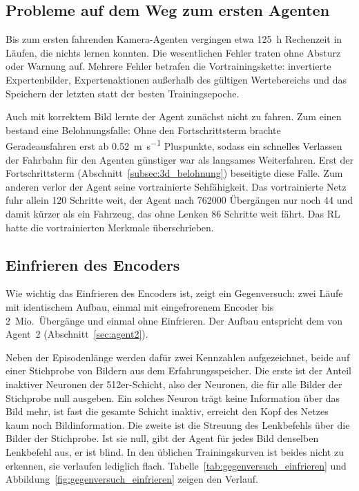 \subsection{Probleme auf dem Weg zum ersten Agenten}
\label{sec:probleme_agent1}

Bis zum ersten fahrenden Kamera-Agenten vergingen etwa \SI{125}{\hour} Rechenzeit in Läufen, die nichts lernen konnten. Die wesentlichen Fehler traten ohne Absturz oder Warnung auf. Mehrere Fehler betrafen die Vortrainingskette: invertierte Expertenbilder, Expertenaktionen außerhalb des gültigen Wertebereichs und das Speichern der letzten statt der besten Trainingsepoche.

Auch mit korrektem Bild lernte der Agent zunächst nicht zu fahren. Zum einen bestand eine Belohnungsfalle: Ohne den Fortschrittsterm brachte Geradeausfahren erst ab \SI{0.52}{\meter\per\second} Pluspunkte, sodass ein schnelles Verlassen der Fahrbahn für den Agenten günstiger war als langsames Weiterfahren. Erst der Fortschrittsterm (Abschnitt~\ref{subsec:3d_belohnung}) beseitigte diese Falle. Zum anderen verlor der Agent seine vortrainierte Sehfähigkeit. Das vortrainierte Netz fuhr allein 120 Schritte weit, der Agent nach \num{762000} Übergängen nur noch 44 und damit kürzer als ein Fahrzeug, das ohne Lenken 86 Schritte weit fährt. Das \ac{RL} hatte die vortrainierten Merkmale überschrieben.

\subsection{Einfrieren des Encoders}
\label{sec:einfrieren}

Wie wichtig das Einfrieren des Encoders ist, zeigt ein Gegenversuch: zwei Läufe mit identischem Aufbau, einmal mit eingefrorenem Encoder bis 2~Mio.\ Übergänge und einmal ohne Einfrieren. Der Aufbau entspricht dem von Agent~2 (Abschnitt~\ref{sec:agent2}).

Neben der Episodenlänge werden dafür zwei Kennzahlen aufgezeichnet, beide auf einer Stichprobe von Bildern aus dem Erfahrungsspeicher. Die erste ist der Anteil inaktiver Neuronen der 512er-Schicht, also der Neuronen, die für alle Bilder der Stichprobe null ausgeben. Ein solches Neuron trägt keine Information über das Bild mehr, ist fast die gesamte Schicht inaktiv, erreicht den Kopf des Netzes kaum noch Bildinformation. Die zweite ist die Streuung des Lenkbefehls über die Bilder der Stichprobe. Ist sie null, gibt der Agent für jedes Bild denselben Lenkbefehl aus, er ist blind. In den üblichen Trainingskurven ist beides nicht zu erkennen, sie verlaufen lediglich flach. Tabelle~\ref{tab:gegenversuch_einfrieren} und Abbildung~\ref{fig:gegenversuch_einfrieren} zeigen den Verlauf.

